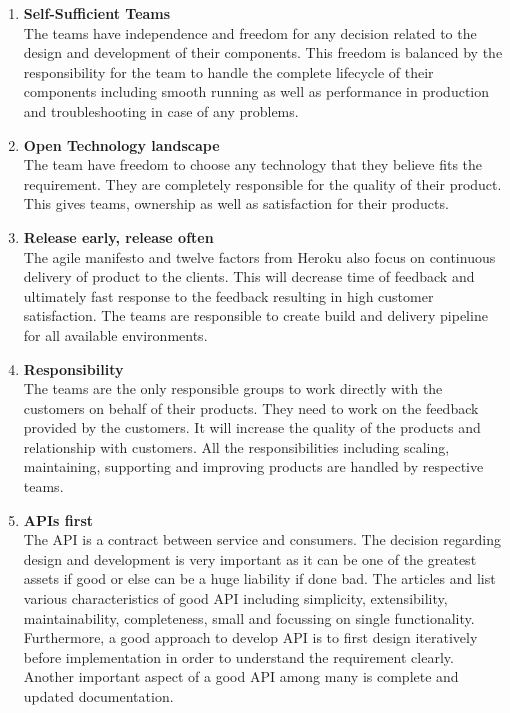 \begin{enumerate}
\item \textbf{Self-Sufficient Teams}\\
The teams have independence and freedom for any decision related to the design and development of their components. This freedom is balanced by the responsibility for the team to handle the complete lifecycle of their components including smooth running as well as performance in production and troubleshooting in case of any problems.
\item \textbf{Open Technology landscape}\\
The team have freedom to choose any technology that they believe fits the requirement. They are completely responsible for the quality of their product. This gives teams, ownership as well as satisfaction for their products.
\item \textbf{Release early, release often}\\
The agile manifesto and twelve factors from Heroku also focus on continuous delivery of product to the clients. This will decrease time of feedback and ultimately fast response to the feedback resulting in high customer satisfaction. The teams are responsible to create build and delivery pipeline for all available environments.
\item \textbf{Responsibility}\\
The teams are the only responsible groups to work directly with the customers on behalf of their products. They need to work on the feedback provided by the customers. It will increase the quality of the products and relationship with customers. All the responsibilities including scaling, maintaining, supporting and improving products are handled by respective teams.
\item \textbf{\acrshort{API}s first}\\
The \acrshort{API} is a contract between service and consumers. The decision regarding design and development is very important as it can be one of the greatest assets if good or else can be a huge liability if done bad. \cite{Bloch:2016aa} The articles \cite{Bloch:2016aa} and \cite{Blanchette:2008aa} list various characteristics of good \acrshort{API} including simplicity, extensibility, maintainability, completeness, small and focussing on single functionality. Furthermore, a good approach to develop \acrshort{API} is to first design iteratively before implementation in order to understand the requirement clearly. Another important aspect of a good \acrshort{API} among many is complete and updated documentation.

\end{enumerate}
